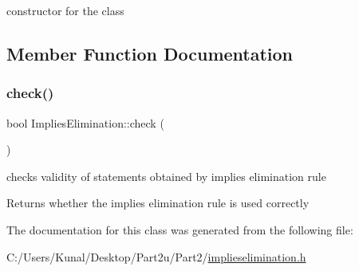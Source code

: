 constructor for the class 



\subsection{Member Function Documentation}
\mbox{\label{class_implies_elimination_a02bc168a71a6657e63f572e95a298f06}} 
\subsubsection{\texorpdfstring{check()}{check()}}
{\footnotesize\ttfamily bool Implies\+Elimination\+::check (\begin{DoxyParamCaption}{ }\end{DoxyParamCaption})\hspace{0.3cm}{\ttfamily [inline]}}



checks validity of statements obtained by implies elimination rule 

\begin{DoxyReturn}{Returns}
whether the implies elimination rule is used correctly 
\end{DoxyReturn}


The documentation for this class was generated from the following file\+:\begin{DoxyCompactItemize}
\item 
C\+:/\+Users/\+Kunal/\+Desktop/\+Part2u/\+Part2/\mbox{\hyperlink{implieselimination_8h}{implieselimination.\+h}}\end{DoxyCompactItemize}
